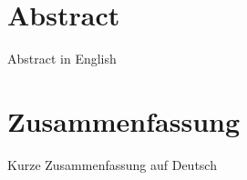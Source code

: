 \begingroup
\let\clearpage\relax
\let\cleardoublepage\relax
\let\cleardoublepage\relax

\chapter*{Abstract}
Abstract in English

\vfill

\chapter*{Zusammenfassung}
Kurze Zusammenfassung auf Deutsch


\endgroup			

\vfill 